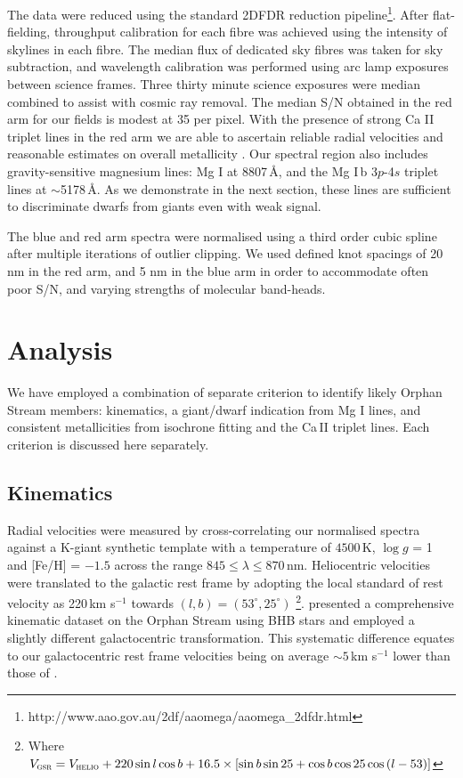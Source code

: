 \documentclass{emulateapj}
\begin{document}
The data were reduced using the standard \textsc{2DFDR} reduction pipeline\footnote{http://www.aao.gov.au/2df/aaomega/aaomega\_2dfdr.html}. After flat-fielding, throughput calibration for each fibre was achieved using the intensity of skylines in each fibre. The median flux of dedicated sky fibres was taken for sky subtraction, and wavelength calibration was performed using arc lamp exposures between science frames. Three thirty minute science exposures were median combined to assist with cosmic ray removal. The median S/N obtained in the red arm for our fields is modest at 35 per pixel. With the presence of strong Ca \textsc{II} triplet lines in the red arm we are able to ascertain reliable radial velocities and reasonable estimates on overall metallicity \citep[][and references therein]{Starkenburg;et-al_2010}. Our spectral region also includes gravity-sensitive magnesium lines: Mg I at 8807\,{\AA}, and the Mg I\,b 3$p$-4$s$ triplet lines at $\sim$5178\,{\AA}. As we demonstrate in the next section, these lines are sufficient to discriminate dwarfs from giants even with weak signal.

The blue and red arm spectra were normalised using a third order cubic spline after multiple iterations of outlier clipping. We used defined knot spacings of 20 nm in the red arm, and 5 nm in the blue arm in order to accommodate often poor S/N, and varying strengths of molecular band-heads.

\section{Analysis}
\label{sec:analysis}

We have employed a combination of separate criterion to identify likely Orphan Stream members: kinematics, a giant/dwarf indication from Mg I lines, and consistent metallicities from isochrone fitting and the Ca\,\textsc{II} triplet lines. Each criterion is discussed here separately.

\subsection{Kinematics}
Radial velocities were measured by cross-correlating our normalised spectra against a K-giant synthetic template with a temperature of $4500$\,K, $\log{g}$ = 1 and [Fe/H] = $-1.5$ across the range $845 \leq \lambda \leq 870$\,nm. Heliocentric velocities were translated to the galactic rest frame by adopting the local standard of rest velocity as 220\,km s$^{-1}$ towards $(l, b) = (53^\circ, 25^\circ)$ \citep{Kerr;Lynden-Bell_1986, Mihalas;Binney_1981}\footnote{Where $V_{\textsc{gsr}} = V_{\textsc{helio}} + 220\sin{l}\cos{b} + 16.5\times[\sin{b}\sin{25} + \cos{b}\cos{25}\cos{(l - 53)}]$}. \citet{Newberg;et-al_2010} presented a comprehensive kinematic dataset on the Orphan Stream using BHB stars and employed a slightly different galactocentric transformation. This systematic difference equates to our galactocentric rest frame velocities being on average $\sim5$\,km s$^{-1}$ lower than those of \citet{Newberg;et-al_2010}.
\end{document}
